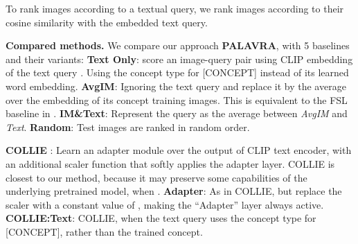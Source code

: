 \documentclass[runningheads]{llncs}
\newcommand\edit[1]{#1}
\newcommand{\concept}{[CONCEPT]}
\begin{document}
To rank images according to a textual query, we rank images according to their cosine similarity with the embedded text query.

\noindent\textbf{Compared methods. }\label{sec_comp_methods_retrieval} We compare our approach \textbf{PALAVRA}, with 5 baselines and their variants: \textbf{Text Only}: score an image-query pair using CLIP embedding of the text query . Using the concept type for \concept{} instead of its learned word embedding.
\textbf{AvgIM}: \edit{Ignoring the text query and replace it} by the average over the embedding of its concept training images. \edit{This is equivalent to the FSL baseline in \cite{chen2021meta}.}
\textbf{IM\&Text}: Represent the query as the average between \hfill \textit{AvgIM} \hfill and \textit{Text}. \hfill  \textbf{Random}: Test \hfill images \hfill are \hfill ranked \hfill in  \hfill  random  \hfill order. 

\textbf{COLLIE} \cite{skantze2021collie}:
 Learn an adapter module over the output of CLIP text encoder, with an additional scaler function  that softly applies the adapter layer. COLLIE is closest to our method, because it may preserve some capabilities of the underlying pretrained model, when .
\textbf{Adapter}: As in COLLIE, but replace the scaler with a constant value of , 
 making the ``Adapter'' layer always active.
\textbf{COLLIE:Text}: COLLIE, when the text query uses the concept type for \concept{}, rather than the trained concept.
\end{document}
